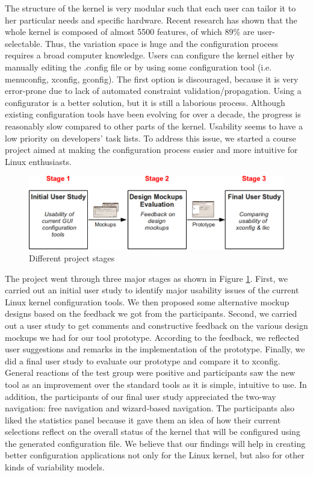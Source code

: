 \documentclass{chi2009}
\begin{document}
The structure of the kernel is very modular such that each user can tailor it to her particular needs and specific hardware. Recent research
\cite{she:kernel:2010} has shown that the whole kernel is composed of almost 5500 features, of which 89\% are user-selectable. Thus, the variation space is huge
and the configuration process requires a broad computer knowledge. Users can configure the kernel either by manually editing the \textsf{.config} file or by
using some configuration tool (i.e. \textsf{menuconfig, xconfig, gconfig}). The first option is discouraged, because it is very error-prone due to lack of
automated constraint validation/propagation. Using a configurator is a better solution, but it is still a laborious process. Although existing configuration
tools have been evolving for over a decade, the progress is reasonably slow compared to other parts of the kernel. Usability seems to have a low priority on
developers' task lists. To address this issue, we started a course project aimed at making the configuration process easier and more intuitive for Linux
enthusiasts.

\begin{figure}[!t]
 \centering
 \includegraphics[scale=0.5,keepaspectratio=true]{figs/flow}
 \caption{Different project stages}
\label{fig:flow}
\end{figure}

The project went through three major stages as shown in Figure \ref{fig:flow}. First, we carried out an initial user study to identify major usability issues of
the current Linux kernel configuration tools. We then proposed some alternative mockup designs based on the feedback we got from the participants. Second, we
carried out a user study to get comments and constructive feedback on the various design mockups we had for our tool prototype. According to the feedback, we
reflected user suggestions and remarks in the implementation of the prototype. Finally, we did a final user study to evaluate our prototype and compare it to
\textsf{xconfig}. General reactions of the test group were positive and participants saw the new tool as an improvement over the standard tools as it is simple,
intuitive to use. In addition, the participants of our final user study appreciated the two-way navigation: free navigation and wizard-based navigation. The
participants also liked the statistics panel because it gave them an idea of how their current selections reflect on the overall status of the kernel that will
be configured using the generated configuration file. We believe that our findings will help in creating better configuration applications not only for the
Linux kernel, but also for other kinds of variability models.
\end{document}
